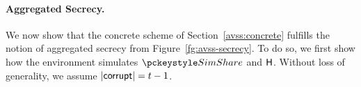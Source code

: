 \paragraph{Aggregated Secrecy.}
We now show that the concrete scheme of Section~\ref{avss:concrete} fulfills the notion of aggregated secrecy from Figure~\ref{fg:avss-secrecy}.
To do so, we first show how the environment simulates $\simshare$ and $\mathsf{H}$.
Without loss of generality, we assume $\lvert \mathsf{corrupt} \rvert = t-1$.

